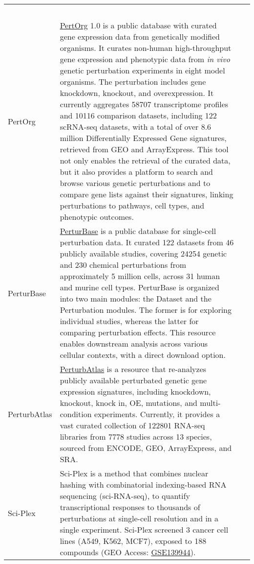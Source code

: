 \begin{newpdflayout}{210mm}{297mm}
\begin{center}
\begin{longtable}{@{} p{} p{} p{} @{}}
  ~\cite{RN120} \\
PertOrg &
  \href{http://www.inbirg.com/pertorg/home}{PertOrg} 1.0 is a public database with curated gene expression data from genetically modified organisms. It curates non-human high-throughput gene expression and phenotypic data from \textit{in vivo} genetic perturbation experiments in eight model organisms. The perturbation includes gene knockdown, knockout, and overexpression. It currently aggregates 58707 transcriptome profiles and 10116 comparison datasets, including 122 \gls{scRNA-seq} datasets, with a total of over 8.6 million Differentially Expressed \gls{Gene signature}s, retrieved from \gls{GEO} and ArrayExpress. This tool not only enables the retrieval of the curated data, but it also provides a platform to search and browse various genetic perturbations and to compare gene lists against their signatures, linking perturbations to pathways, cell types, and phenotypic outcomes. &
  ~\cite{RN85} \\
PerturBase &
  \href{http://www.perturbase.cn/}{PerturBase} is a public database for single-cell perturbation data. It curated 122 datasets from 46 publicly available studies, covering 24254 genetic and 230 chemical perturbations from approximately 5 million cells, across 31 human and murine cell types. PerturBase is organized into two main modules: the Dataset and the Perturbation modules. The former is for exploring individual studies, whereas the latter for comparing perturbation effects. This resource enables downstream analysis across various cellular contexts, with a direct download option. &
  ~\cite{RN97} \\
PerturbAtlas &
  \href{https://perturbatlas.kratoss.site/#/}{PerturbAtlas} is a resource that re-analyzes publicly available perturbated genetic gene expression signatures, including knockdown, knockout, knock in, \gls{OE}, mutations, and multi-condition experiments. Currently, it provides a vast curated collection of 122801 \gls{RNA-seq} libraries from 7778 studies across 13 species, sourced from ENCODE, GEO, ArrayExpress, and SRA. &
  ~\cite{RN129} \\
Sci-Plex &
  Sci-Plex is a method that combines nuclear hashing with combinatorial indexing-based RNA sequencing (sci-RNA-seq), to quantify transcriptional responses to thousands of perturbations at single-cell resolution and in a single experiment. Sci-Plex screened 3 cancer cell lines (A549, K562, MCF7), exposed to 188 compounds (GEO Access: \href{https://www.ncbi.nlm.nih.gov/geo/query/acc.cgi?acc=GSE139944}{GSE139944}). &

\end{longtable}
\end{center}
\end{newpdflayout}
